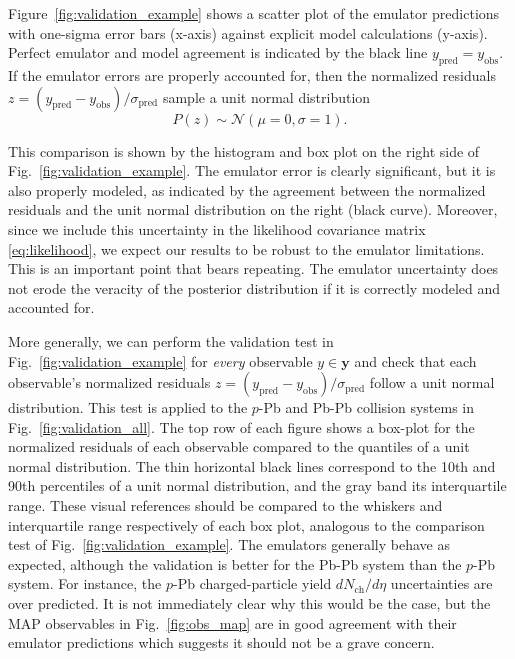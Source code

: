 \documentclass[aps,prc,reprint,amsmath,nofootinbib]{revtex4-1}
\newcommand{\nch}{N_\text{ch}}
\newcommand{\yv}{\mathbf y}
\begin{document}
Figure~\ref{fig:validation_example} shows a scatter plot of the emulator predictions with one-sigma error bars (x-axis) against explicit model calculations (y-axis).
Perfect emulator and model agreement is indicated by the black line $y_\text{pred} = y_\text{obs}$.
If the emulator errors are properly accounted for, then the normalized residuals ${z=(y_\text{pred} - y_\text{obs})/\sigma_\text{pred}}$ sample a unit normal distribution
\begin{equation}
  \label{eq:frac_error}
  P(z) \sim \mathcal{N}(\mu=0,\sigma=1).
\end{equation}

This comparison is shown by the histogram and box plot on the right side of Fig.~\ref{fig:validation_example}.
The emulator error is clearly significant, but it is also properly modeled, as indicated by the agreement between the normalized residuals and the unit normal distribution on the right (black curve).
Moreover, since we include this uncertainty in the likelihood covariance matrix \eqref{eq:likelihood}, we expect our results to be robust to the emulator limitations.
This is an important point that bears repeating.
The emulator uncertainty does not erode the veracity of the posterior distribution if it is correctly modeled and accounted for.

More generally, we can perform the validation test in Fig.~\ref{fig:validation_example} for \emph{every} observable $y \in \yv$ and check that each observable's normalized residuals ${z=(y_\text{pred} - y_\text{obs})/\sigma_\text{pred}}$ follow a unit normal distribution.
This test is applied to the $p$-Pb and Pb-Pb collision systems in Fig.~\ref{fig:validation_all}.
The top row of each figure shows a box-plot for the normalized residuals of each observable compared to the quantiles of a unit normal distribution.
The thin horizontal black lines correspond to the 10th and 90th percentiles of a unit normal distribution, and the gray band its interquartile range.
These visual references should be compared to the whiskers and interquartile range respectively of each box plot, analogous to the comparison test of Fig.~\ref{fig:validation_example}.
The emulators generally behave as expected, although the validation is better for the Pb-Pb system than the $p$-Pb system.
For instance, the $p$-Pb charged-particle yield $d\nch/d\eta$ uncertainties are over predicted.
It is not immediately clear why this would be the case, but the MAP observables in Fig.~\ref{fig:obs_map} are in good agreement with their emulator predictions which suggests it should not be a grave concern.
\end{document}

